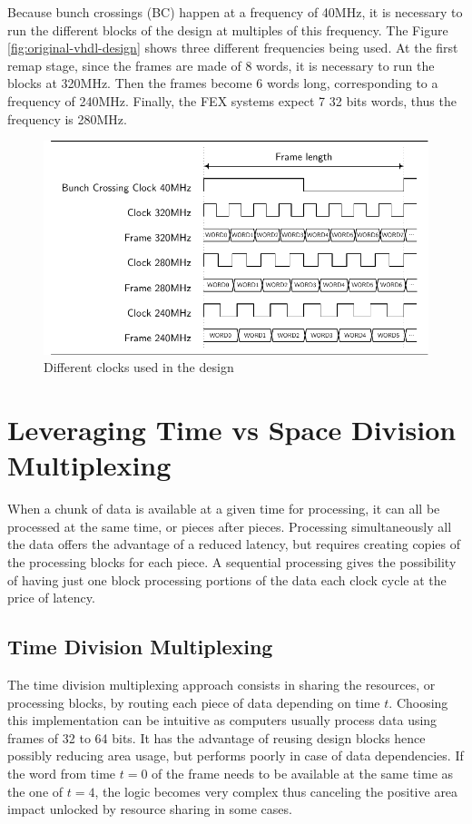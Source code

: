 Because bunch crossings (BC) happen at a frequency of 40MHz, it is necessary to run the different blocks of the design at multiples of this frequency. The Figure \ref{fig:original-vhdl-design} shows three different frequencies being used. At the first remap stage, since the frames are made of 8 words, it is necessary to run the blocks at 320MHz. Then the frames become 6 words long, corresponding to a frequency of 240MHz. Finally, the FEX systems expect 7 32 bits words, thus the frequency is 280MHz.

\begin{figure}[htb]
    \centering
    \includegraphics{timings/bc_clocks}
    \caption{Different clocks used in the design}
    \label{fig:bc-clocks}
\end{figure}


\section{Leveraging Time vs Space Division Multiplexing}\label{sec:leveraging-time-division-multiplexing}

When a chunk of data is available at a given time for processing, it can all be processed at the same time, or pieces after pieces.
Processing simultaneously all the data offers the advantage of a reduced latency, but requires creating copies of the processing blocks for each piece. A sequential processing gives the possibility of having just one block processing portions of the data each clock cycle at the price of latency.

\subsection{Time Division Multiplexing}\label{sec:time-division-multiplexing}
The time division multiplexing approach consists in sharing the resources, or processing blocks, by routing each piece of data depending on time \(t\). Choosing this implementation can be intuitive as computers usually process data using frames of 32 to 64 bits. It has the advantage of reusing design blocks hence possibly reducing area usage, but performs poorly in case of data dependencies. If the word from time \(t=0\) of the frame needs to be available at the same time as the one of \(t=4\), the logic becomes very complex thus canceling the positive area impact unlocked by resource sharing in some cases.

